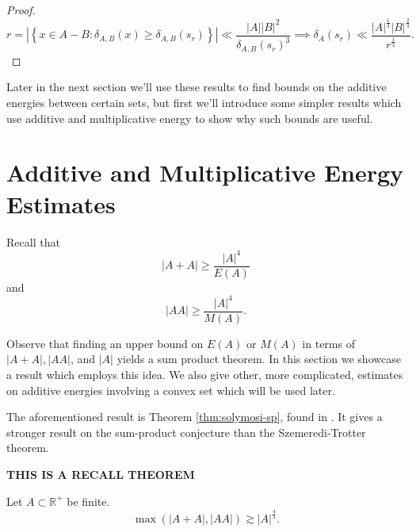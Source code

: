 \documentclass[12pt,reqno]{amsart}
\begin{document}
\begin{proof}
\[
    r = \left\lvert \left\{ x \in A-B : \delta _{A,B} (x) \geq \delta_{A,B} (s _{r} ) \right\}  \right\rvert \ll \frac{\left\lvert A \right\rvert \left\lvert B \right\rvert ^{2} }{\delta_{A,B} (s _{r} )^{3} } \implies \delta_{A} (s _{r} ) \ll \frac{\left\lvert A \right\rvert ^{\frac{1}{3} } \left\lvert B \right\rvert ^{\frac{2}{3} }}{r^{\frac{1}{3} }}
.\]
\end{proof}

Later in the next section we'll use these results to find bounds on the additive
energies between certain sets, but first we'll introduce some simpler results which
use additive and multiplicative energy to show why such bounds are useful.

\section{Additive and Multiplicative Energy Estimates}

Recall that
\[
    \left\lvert A + A \right\rvert \geq  \frac{\left\lvert A \right\rvert ^{4}}{ E(A) }
\]
and
\[
    \left\lvert AA \right\rvert \geq \frac{\left\lvert A \right\rvert ^{4}}{M(A) }
.\]

Observe that finding an upper bound on \(E(A)\) or \(M(A)\) in terms of \(\left\lvert A + A \right\rvert, \left\lvert AA \right\rvert    \), and \(\left\lvert A \right\rvert \)
yields a sum product theorem. In this section we showcase a result which employs this idea.
We also give other, more complicated, estimates on additive energies involving a convex set which
will be used later.

The aforementioned result is Theorem \ref{thm:solymosi-sp}, found in \cite{Solymosi}. It gives a stronger result
on the sum-product conjecture than the Szemeredi-Trotter theorem. 

\textbf{THIS IS A RECALL THEOREM}
\begin{theorem}\label{thm:solymosi}
Let \(A \subset \mathbb{R}^{+} \) be finite.
\[
    \max \left( \left\lvert A+A \right\rvert , \left\lvert AA \right\rvert  \right) \gtrsim  \left\lvert A \right\rvert ^{\frac{4}{3}}
.\]
\end{theorem}
\end{document}
